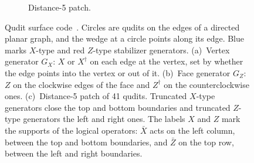 \begin{figure}[H]
\begin{minipage}[t]{0.62\textwidth}
\begin{subfigure}[t]{\linewidth}
      \caption{Distance-5 patch.}
      \label{fig:patch}
    \end{subfigure}
  \end{minipage}

  \caption{Qudit surface code~\cite{Moussa2016}. Circles are qudits on the edges of a directed planar graph, and the wedge at a circle points along its edge. Blue marks $X$-type and red $Z$-type stabilizer generators.
  (a)~Vertex generator $G_X$: $X$ or $X^\dagger$ on each edge at the vertex, set by whether the edge points into the vertex or out of it.
  (b)~Face generator $G_Z$: $Z$ on the clockwise edges of the face and $Z^\dagger$ on the counterclockwise ones.
  (c)~Distance-5 patch of 41 qudits. Truncated $X$-type generators close the top and bottom boundaries and truncated $Z$-type generators the left and right ones. The labels $X$ and $Z$ mark the supports of the logical operators: $\bar X$ acts on the left column, between the top and bottom boundaries, and $\bar Z$ on the top row, between the left and right boundaries.}
  \label{fig:qudit-surface-code}
\end{figure}
